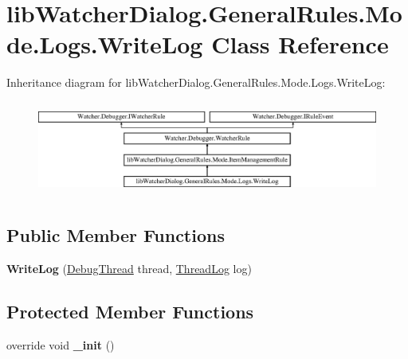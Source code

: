 \hypertarget{classlib_watcher_dialog_1_1_general_rules_1_1_mode_1_1_logs_1_1_write_log}{\section{lib\+Watcher\+Dialog.\+General\+Rules.\+Mode.\+Logs.\+Write\+Log Class Reference}
\label{classlib_watcher_dialog_1_1_general_rules_1_1_mode_1_1_logs_1_1_write_log}
}
Inheritance diagram for lib\+Watcher\+Dialog.\+General\+Rules.\+Mode.\+Logs.\+Write\+Log\+:\begin{figure}[H]
\begin{center}
\leavevmode
\includegraphics[height=3.154930cm]{classlib_watcher_dialog_1_1_general_rules_1_1_mode_1_1_logs_1_1_write_log}
\end{center}
\end{figure}
\subsection*{Public Member Functions}
\begin{DoxyCompactItemize}
\item 
\hypertarget{classlib_watcher_dialog_1_1_general_rules_1_1_mode_1_1_logs_1_1_write_log_afd51d409fabd2bbe34a5b243740cc990}{{\bfseries Write\+Log} (\hyperlink{classlib_wather_debugger_1_1_thread_1_1_debug_thread}{Debug\+Thread} thread, \hyperlink{classlib_watcher_dialog_1_1_property_item_1_1_logger_1_1_thread_log}{Thread\+Log} log)}\label{classlib_watcher_dialog_1_1_general_rules_1_1_mode_1_1_logs_1_1_write_log_afd51d409fabd2bbe34a5b243740cc990}

\end{DoxyCompactItemize}
\subsection*{Protected Member Functions}
\begin{DoxyCompactItemize}
\item 
\hypertarget{classlib_watcher_dialog_1_1_general_rules_1_1_mode_1_1_logs_1_1_write_log_a74cace2aaf4180d2e5876a3d88680bf7}{override void {\bfseries \+\_\+init} ()}\label{classlib_watcher_dialog_1_1_general_rules_1_1_mode_1_1_logs_1_1_write_log_a74cace2aaf4180d2e5876a3d88680bf7}

\end{DoxyCompactItemize}
